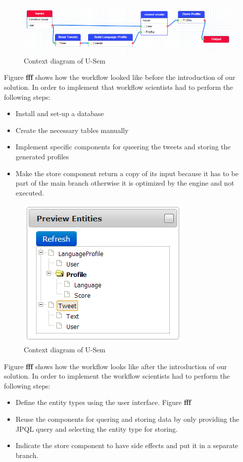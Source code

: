\documentclass[a4paper, notitlepage]{article}
\begin{document}
\begin{figure}[h!]
  \centering
  	\includegraphics[scale=0.5]{eval/before.png}
  \caption{Context diagram of U-Sem }
  \label{fig_context}
\end{figure}

Figure \textbf{fff} shows how the workflow looked like before the introduction of our solution. In order to implement that workflow scientists had to perform the following steps:
\begin{itemize}
	\item Install and set-up a database
	\item Create the necessary tables manually
	\item Implement specific components for queering the tweets and storing the generated profiles
	\item Make the store component return a copy of its input because it has to be part of the main branch otherwise it is optimized by the engine and not executed.
\end{itemize}

\begin{figure}[h!]
  \centering
  	\includegraphics[scale=0.5]{eval/entities.png}
  \caption{Context diagram of U-Sem }
  \label{fig_context}
\end{figure}

Figure \textbf{fff} shows how the workflow looks like after the introduction of our solution. In order to implement the workflow scientists had to perform the following steps:
\begin{itemize}
	\item Define the entity types using the user interface. Figure \textbf{fff}
	\item Reuse the components for quering and storing data by only providing the JPQL query and selecting the entity type for storing.
	\item Indicate the store component to have side effects and put it in a separate branch.
\end{itemize}
\end{document}
